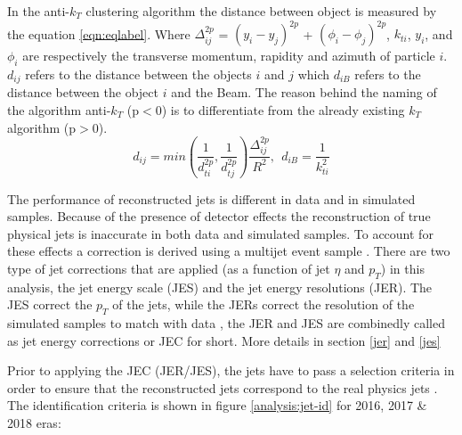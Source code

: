 In the anti-$k_{T}$ clustering algorithm the distance between object is measured by the equation \ref{eqn:eqlabel}. Where $\Delta_{ij}^{2p}$ = $\left(y_{i} - y_{j}\right)^{2p}$ + $\left(\phi_{i} - \phi_{j}\right)^{2p}$, $k_{ti}$, $y_{i}$, and $\phi_{i}$ are respectively the transverse momentum,
rapidity and azimuth of particle $i$. $d_{ij}$ refers to the distance between the objects $i$ and $j$ which $d_{iB}$ refers to the distance between the object $i$ and the Beam. The reason behind the naming of the algorithm anti-$k_{T}$ (p$<$0) is to differentiate from the already existing $k_{T}$ algorithm (p$>$0).
\begin{equation}
\label{eqn:eqlabel}
d_{ij} = min\left(\frac{1}{d_{ti}^{2p}}, \frac{1}{d_{tj}^{2p}}\right) \frac{\Delta_{ij}^{2p}}{R^{2}}, \:\: d_{iB} = \frac{1}{k_{ti}^{2}}
\end{equation}

The performance of reconstructed jets is different in data and in simulated samples. Because of the presence of detector effects the reconstruction of true physical jets is inaccurate in both data and simulated samples. To account for these effects a correction is derived using a multijet event sample \cite{jecjer}. There are two type of jet corrections that are applied (as a function of jet $\eta$ and $p_{T}$) in this analysis, the jet energy scale (JES) and the jet energy resolutions (JER). The JES correct the $p_{T}$ of the jets, while the JERs correct the resolution of the simulated samples to match with data \cite{jecjer}, the JER and JES are combinedly called as jet energy corrections or JEC for short. More details in section \ref{jer} and \ref{jes}

Prior to applying the JEC (JER/JES), the jets have to pass a selection criteria in order to ensure that the reconstructed jets correspond to the real physics jets \cite{good-jets}. The identification criteria is shown in figure \ref{analysis:jet-id} for 2016, 2017 \& 2018 eras:

